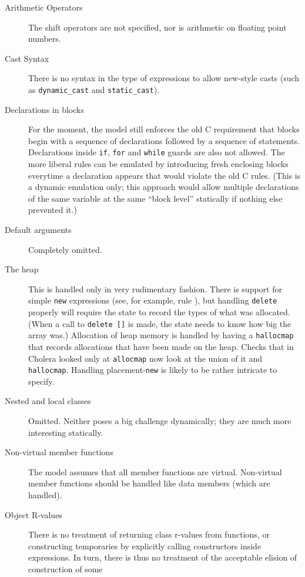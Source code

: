 \documentclass[11pt]{article}
\begin{document}
\begin{description}
\item[Arithmetic Operators]  The shift operators are not specified,
  nor is arithmetic on floating point numbers.
\item[Cast Syntax] There is no syntax in the type of expressions to
  allow new-style \cpp{} casts (such as \texttt{dynamic_cast} and
  \texttt{static_cast}).
\item[Declarations in blocks] For the moment, the model still enforces
  the old C requirement that blocks begin with a sequence of
  declarations followed by a sequence of statements.  Declarations
  inside \texttt{if}, \texttt{for} and \texttt{while} guards are also
  not allowed.  The more liberal \cpp{} rules can be emulated by
  introducing fresh enclosing blocks everytime a declaration appears
  that would violate the old C rules.  (This is a dynamic emulation
  only; this approach would allow multiple declarations of the same
  variable at the same ``block level'' statically if nothing else
  prevented it.)
\item[Default arguments]  Completely omitted.
\item[The heap] This is handled only in very rudimentary fashion.
  There is support for simple \texttt{new} expressions (see, for
  example, rule ), but handling \texttt{delete}
  properly will require the state to record the types of what was
  allocated.  (When a call to \texttt{delete []} is made, the state
  needs to know how big the array was.) Allocation of heap memory is
  handled by having a \texttt{hallocmap} that records allocations that
  have been made on the heap.  Checks that in \textsf{Cholera} looked
  only at \texttt{allocmap} now look at the union of it and
  \texttt{hallocmap}.  Handling placement-\texttt{new} is likely to be
  rather intricate to specify.
\item[Nested and local classes] Omitted.  Neither poses a big
  challenge dynamically; they are much more interesting statically.
\item[Non-virtual member functions] The model assumes that all member
  functions are virtual.  Non-virtual member functions should be
  handled like data members (which are handled).
\item[Object R-values] There is no treatment of returning class
  r-values from functions, or constructing temporaries by explicitly
  calling constructors inside expressions.  In turn, there is thus no
  treatment of the acceptable elision of construction of some

\end{description}
\end{document}
